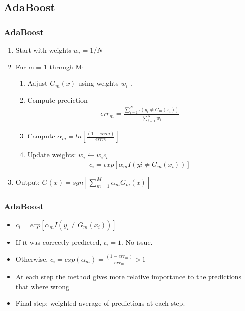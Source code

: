 \documentclass[
  shownotes,
  xcolor={svgnames},
  hyperref={colorlinks,citecolor=DarkBlue,linkcolor=DarkRed,urlcolor=DarkBlue}
  , aspectratio=169]{beamer}
\begin{document}
\subsection{AdaBoost}
\begin{frame}[fragile]
\frametitle{AdaBoost}
\begin{enumerate}
\item Start with weights $w_i = 1 / N$
\item For m = 1 through M:
\begin{enumerate}
    \item Adjust $G_m(x)$ using weights $w_i$ .
    \item Compute prediction 
    \begin{align}
    err_m = \frac{\sum_{i=1}^N  I(y_i \neq G_m(x_i))}{\sum_{i=1}^N w_i}
    \end{align}
    \item Compute $\alpha_m= ln \left[\frac{(1 - err m )}{ err m} \right]$
    \item Update weights: $w_i \leftarrow w_i c_i$ 
    \begin{align}
    c_i = exp \left[\alpha_m  I (y i \neq G_m (x_i )) \right]
    \end{align}
    
\end{enumerate}
\item Output: $G(x) = sgn[\sum_{m = 1}^M \alpha_m G_m(x)]$
\end{enumerate}

\end{frame} 
\begin{frame}[fragile]
\frametitle{AdaBoost}

\begin{itemize}
\item $c_i = exp \left[ \alpha_m I(y_i \neq G_m (x_i )) \right]$
\medskip
\item If it was correctly predicted, $c_i = 1$. No issue.
\medskip
\item Otherwise, $c_i = exp (\alpha_m ) = \frac{(1 - err_m ) }{err_m} > 1$ 
\medskip
\item At each step the method gives more relative importance to the predictions that where wrong.
\medskip
\item Final step: weighted average of predictions at each step.
\end{itemize}
\end{frame}
\end{document}
